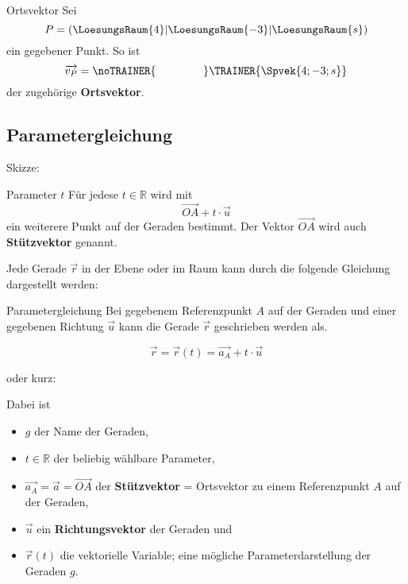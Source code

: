 \begin{beispiel}{Ortsvektor}{}
  Sei
  $$P=(\LoesungsRaum{4}|\LoesungsRaum{-3}|\LoesungsRaum{s})$$
  ein
gegebener Punkt. So ist
 $$\overrightarrow{v_P}
= \noTRAINER{\hspace{15mm}} \TRAINER{\Spvek{4;-3;s}}$$
der zugehörige \textbf{Ortsvektor}.
\end{beispiel}

\newpage
\subsection{Parametergleichung}

Skizze:


\begin{bemerkung}{Parameter $t$}{}
  Für jedese $t\in\mathbb{R}$ wird mit
  $$\overrightarrow{OA} + t\cdot{} \vec{u}$$
  ein weiterere Punkt auf der Geraden bestimmt. Der Vektor $\overrightarrow{OA}$ wird
  auch \textbf{Stützvektor} genannt.
  \end{bemerkung}
\newpage

Jede Gerade $\vec{r}$ in der Ebene oder im Raum kann durch die
folgende Gleichung dargestellt werden:

\begin{definition}{Parametergleichung}{}
  Bei gegebenem Referenzpunkt $A$ auf der Geraden und einer gegebenen
  Richtung $\vec{u}$ kann die Gerade $\vec{r}$ geschrieben werden als.
  
  $$\vec{r} = \vec{r}(t) = \overrightarrow{a_A} + t\cdot{} \vec{u}$$

  oder kurz:

  \begin{center}\end{center}
  
  Dabei ist
  \begin{itemize}
    \item $g$ der Name der Geraden,
    \item $t\in\mathbb{R}$ der beliebig wählbare Parameter,
    \item $\overrightarrow{a_A} = \vec{a} = \overrightarrow{OA}$ der
      \textbf{Stützvektor} = Ortsvektor zu einem Referenzpunkt $A$ auf der Geraden,
    \item $\vec{u}$ ein
      \textbf{Richtungsvektor} der Geraden und
    \item $\vec{r}(t)$ die vektorielle Variable; eine mögliche
      Parameterdarstellung der Geraden $g$.
  \end{itemize}
  
\end{definition}

